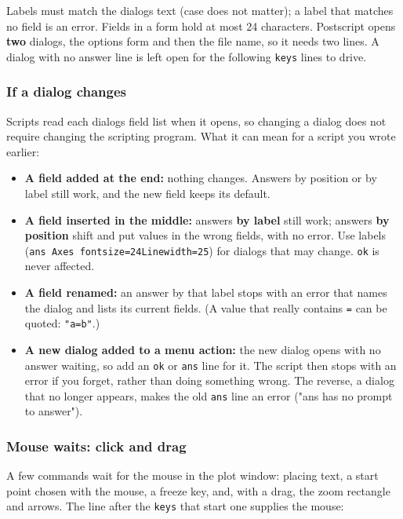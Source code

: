\documentclass{article}
\providecommand{\tightlist}{\setlength{\itemsep}{0pt}\setlength{\parskip}{0pt}}
\begin{document}
Labels must match the dialog\textquotesingle s text (case does not matter); a label
that matches no field is an error. Fields in a form hold at most 24
characters. Postscript opens \textbf{two} dialogs, the options
form and then the file name, so it needs two lines. A dialog with no
answer line is left open for the following \texttt{keys} lines to
drive.

\subsubsection{If a dialog changes}

Scripts read each dialog\textquotesingle s field list when it opens, so changing a
dialog does not require changing the scripting program. What it can mean
for a script you wrote earlier:

\begin{itemize}
\tightlist
\item
  \textbf{A field added at the end:} nothing changes. Answers
  by position or by label still work, and the new field keeps its
  default.
\item
  \textbf{A field inserted in the middle:} answers \textbf{by
  label} still work; answers \textbf{by position} shift
  and put values in the wrong fields, with no error. Use labels
  (\texttt{ans\ Axes\ fontsize=24\textbar{}Linewidth=25}) for dialogs that may
  change. \texttt{ok} is never affected.
\item
  \textbf{A field renamed:} an answer by that label stops with
  an error that names the dialog and lists its current fields. (A value
  that really contains \texttt{=} can be quoted:
  \texttt{"a=b"}.)
\item
  \textbf{A new dialog added to a menu action:} the new dialog
  opens with no answer waiting, so add an \texttt{ok} or
  \texttt{ans} line for it. The script then stops with an error if you
  forget, rather than doing something wrong. The reverse, a dialog that no
  longer appears, makes the old \texttt{ans} line an error ("ans has
  no prompt to answer").
\end{itemize}

\subsubsection{Mouse waits: click and drag}

A few commands wait for the mouse in the plot window: placing text, a
start point chosen with the mouse, a freeze key, and, with a drag, the
zoom rectangle and arrows. The line after the \texttt{keys} that
start one supplies the mouse:
\end{document}
